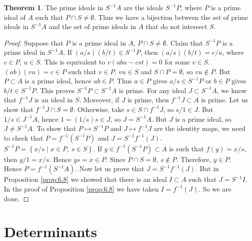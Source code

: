 \documentclass{article}
\newcommand{\rb}[1]{\left( #1 \right)}
\newcommand{\cb}[1]{\left\{ #1 \right\}}
\theoremstyle{definition}\newtheorem{definition}{Definition}[section]
\theoremstyle{definition}\newtheorem{remark}[definition]{Remark}
\theoremstyle{definition}\newtheorem*{example}{Example}
\theoremstyle{definition}\newtheorem*{note}{Note}
\newtheorem{theorem}[definition]{Theorem}
\begin{document}
\begin{theorem}
\label{thm:6.9}
The prime ideals in $ S^{-1}A $ are the ideals $ S^{-1}P $, where $ P $ is a prime ideal of $ A $ such that $ P \cap S \ne \emptyset $. Thus we have a bijection between the set of prime ideals in $ S^{-1}A $ and the set of prime ideals in $ A $ that do not intersect $ S $.
\end{theorem}

\begin{proof}
Suppose that $ P $ is a prime ideal in $ A $, $ P \cap S \ne \emptyset $. Claim that $ S^{-1}P $ is a prime ideal in $ S^{-1}A $. If $ \rb{a / s}\rb{b / t} \in S^{-1}P $, then $ \rb{a / s}\rb{b / t} = c / u $, where $ c \in P $, $ u \in S $. This is equivalent to $ v\rb{abu - cst} = 0 $ for some $ v \in S $. $ \rb{ab}\rb{vu} = c \in P $ such that $ v \in P $. $ vu \in S $ and $ S \cap P = \emptyset $, so $ vu \notin P $. But $ P \subset A $ is a prime ideal, hence $ ab \in P $. Thus $ a \in P $ gives $ a / s \in S^{-1}P $ or $ b \in P $ gives $ b / t \in S^{-1}P $. This proves $ S^{-1}P \subset S^{-1}A $ is prime. For any ideal $ J \subset S^{-1}A $, we know that $ f^{-1}J $ is an ideal in $ S $. Moreover, if $ J $ is prime, then $ f^{-1}J \subset A $ is prime. Let us show that $ f^{-1}J \cap S = \emptyset $. Otherwise, take $ s \in S \cap f^{-1}J $, so $ s / 1 \in J $. But $ 1 / s \in J^{-1}A $, hence $ 1 = \rb{1 / s}s \in J $, so $ J = S^{-1}A $. But $ J $ is a prime ideal, so $ J \ne S^{-1}A $. To show that $ P \mapsto S^{-1}P $ and $ J \mapsto f^{-1}J $ are the identity maps, we need to check that $ P = f^{-1}\rb{S^{-1}P} $ and $ J = S^{-1}f^{-1}\rb{J} $. $ S^{-1}P = \cb{x / s \mid x \in P, \ s \in S} $. If $ y \in f^{-1}\rb{S^{-1}P} \subset A $  is such that $ f\rb{y} = x / s $, then $ y / 1 = x / s $. Hence $ ys = x \in P $. Since $ P \cap S = \emptyset $, $ s \notin P $. Therefore, $ y \in P $. Hence $ P = f^{-1}\rb{S^{-1}A} $. Now let us prove that $ J = S^{-1}f^{-1}\rb{J} $. But in Proposition \ref{prop:6.8} we showed that there is an ideal $ I \subset A $ such that $ J = S^{-1}I $. In the proof of Proposition \ref{prop:6.8} we have taken $ I = f^{-1}\rb{J} $. So we are done.
\end{proof}


\section{Determinants}
\end{document}
